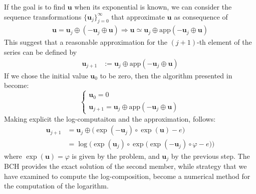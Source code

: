 If the goal is to find $\mathbf{u}$ when its exponential is known, we can consider the sequence transformations $\{\mathbf{u}_{j}  \}_{j=0}^{\infty}$ that approximate $\mathbf{u}$ as consequence of
\begin{align*}
\mathbf{u} = \mathbf{u}_{j} \oplus  (-\mathbf{u}_{j}  \oplus  \mathbf{u} ) \Longrightarrow
\mathbf{u} \simeq \mathbf{u}_{j} \oplus  \text{app}(-\mathbf{u}_{j}  \oplus  \mathbf{u} )
\end{align*}
This suggest that a reasonable approximation for the $(j+1)$-th element of the series can be defined by
\begin{align*}
\mathbf{u}_{j+1} & :=  \mathbf{u}_{j} \oplus  \text{app}(-\mathbf{u}_{j}  \oplus  \mathbf{u} )
\end{align*}
If we chose the initial value $\mathbf{u}_{0}$ to be zero, then the algorithm presented in \cite{Bossa:08}  become:
\begin{equation}\label{eq:bossa_reformulated}
\begin{cases}
\mathbf{u}_0 = 0 \\
\mathbf{u}_{j+1} = \mathbf{u}_{j} \oplus  \text{app}(-\mathbf{u}_{j}  \oplus  \mathbf{u} )
\end{cases}
\end{equation}
Making explicit the log-computaiton and the approximation, follows:
\begin{align}
\mathbf{u}_{j+1} 
&=
\mathbf{u}_{j} \oplus \big( \exp(-\mathbf{u}_{j})  \circ   \exp(\mathbf{u}) - e \big)\\
&=
 \log\Big( \exp( \mathbf{u}_{j}) \circ \exp \big( \exp(-\mathbf{u}_{j})  \circ  \varphi - e \big) \Big)
\end{align}
where $\exp(\mathbf{u}) = \varphi$ is given by the problem, and $\mathbf{u}_{j}$ by the previous step. The BCH provides the exact solution of the second member, while strategy that we have examined to compute the log-composition, become a numerical method for the computation of the logarithm.
